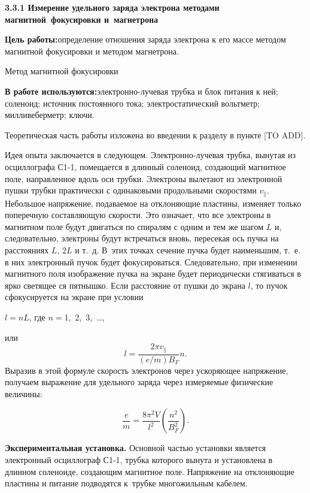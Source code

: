

{\large \bf 3.3.1 Измерение удельного заряда электрона методами магнитной~фокусировки и~магнетрона}

{\bf Цель работы:}определение отношения заряда электрона к его массе методом магнитной фокусировки и методом магнетрона.



{\LARGE  Метод магнитной фокусировки}

{\bf В работе используются:}{электронно-лучевая трубка и блок питания к ней; соленоид; источник постоянного тока; электростатический вольтметр; милливеберметр; ключи.}

Теоретическая часть работы изложена во введении к разделу в пункте [TO ADD].

Идея опыта заключается в следующем. Электронно-лучевая трубка, вынутая из осциллографа С1-1, помещается в длинный соленоид, создающий магнитное поле, направленное вдоль оси трубки. Электроны вылетают из электронной пушки трубки практически с одинаковыми продольными скоростями $v_{\parallel}$. Небольшое напряжение, подаваемое на отклоняющие пластины, изменяет только поперечную составляющую скорости. Это означает, что все электроны в магнитном поле будут двигаться по спиралям с одним и тем же шагом $L$ и, следовательно, электроны будут встречаться вновь, пересекая ось пучка на расстояниях $L$, $2L$ и т.~д. В~этих точках сечение пучка будет наименьшим, т.~е. в них электронный пучок будет фокусироваться. Следовательно, при изменении магнитного поля изображение пучка на экране будет периодически стягиваться в ярко светящее ся пятнышко. Если расстояние от пушки до экрана $l$, то пучок сфокусируется на экране при условии

$l=nL$, где $n=$1,\, 2,\, 3,\, \ldots,

или
$$
l=\frac{2\pi v_{\parallel}}{(e/m)B_F}n.
$$
Выразив в этой формуле скорость электронов через ускоряющее напряжение, получаем выражение для удельного заряда через измеряемые физические величины:

\begin{equation}
\frac{e}{m}=\frac{8\pi^2V}{l^2}\left(\frac{n^2}{B_F^2}\right).
\label{eq3.1.11}
\end{equation}

{\bf Экспериментальная установка.} Основной частью установки является электронный осциллограф С1-1, трубка которого вынута и установлена в длинном соленоиде, создающим магнитное поле. Напряжение на отклоняющие пластины и питание подводятся к~трубке многожильным кабелем.

